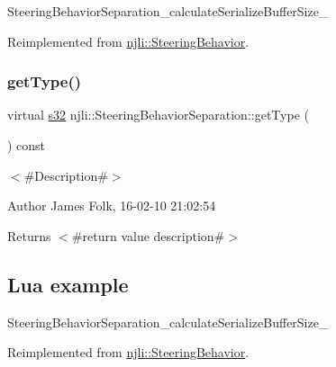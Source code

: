 \begin{DoxyCodeInclude}
\end{DoxyCodeInclude}
Steering\+Behavior\+Separation\+\_\+calculate\+Serialize\+Buffer\+Size\+\_\+ 

Reimplemented from \mbox{\hyperlink{classnjli_1_1_steering_behavior_abb58d6982dc295fc3e90f096f51b0ef8}{njli\+::\+Steering\+Behavior}}.

\mbox{\label{classnjli_1_1_steering_behavior_separation_a682b4beac8d2750bae905e45efedb52b}} 
\subsubsection{\texorpdfstring{get\+Type()}{getType()}}
{\footnotesize\ttfamily virtual \mbox{\hyperlink{_util_8h_aa62c75d314a0d1f37f79c4b73b2292e2}{s32}} njli\+::\+Steering\+Behavior\+Separation\+::get\+Type (\begin{DoxyParamCaption}{ }\end{DoxyParamCaption}) const\hspace{0.3cm}{\ttfamily [virtual]}}



$<$\#\+Description\#$>$ 

\begin{DoxyAuthor}{Author}
James Folk, 16-\/02-\/10 21\+:02\+:54
\end{DoxyAuthor}
\begin{DoxyReturn}{Returns}
$<$\#return value description\#$>$
\end{DoxyReturn}
\hypertarget{classnjli_1_1_steering_behavior_wander_ex1}{}\subsection{Lua example}\label{classnjli_1_1_steering_behavior_wander_ex1}

\begin{DoxyCodeInclude}
\end{DoxyCodeInclude}
Steering\+Behavior\+Separation\+\_\+calculate\+Serialize\+Buffer\+Size\+\_\+ 

Reimplemented from \mbox{\hyperlink{classnjli_1_1_steering_behavior_ae82bca8468d41aff8c22b76fd359fe9b}{njli\+::\+Steering\+Behavior}}.

